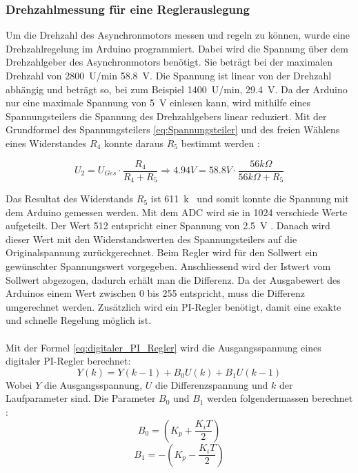\subsubsection{Drehzahlmessung für eine Reglerauslegung}
Um die Drehzahl des Asynchronmotors messen und regeln zu können, wurde eine Drehzahlregelung im Arduino programmiert. Dabei wird die Spannung über dem Drehzahlgeber des Asynchronmotors benötigt. Sie beträgt bei der maximalen Drehzahl von \SI{2800}{U/min} \SI{58.8}{V}. Die Spannung ist linear von der Drehzahl abhängig und beträgt so, bei zum Beispiel \SI{1400}{U/min}, \SI{29.4}{V}. Da der Arduino nur eine maximale Spannung von \SI{5}{V} einlesen kann, wird mithilfe eines Spannungsteilers die Spannung des Drehzahlgebers linear reduziert. Mit der Grundformel des Spannungsteilers \ref{eq:Spannungsteiler} und des freien Wählens eines Widerstandes $R_4$ konnte daraus $R_5$ bestimmt werden \cite{Spannungsteiler}:

\begin{equation}\label{eq:Spannungsteiler}
U_2=U_{Ges} \cdot\frac{R_4}{R_4 + R_5} \Longrightarrow 4.94 V = 58.8 V \cdot \frac{56k\Omega}{56k\Omega + R_5}
\end{equation}

Das Resultat des Widerstands $R_5$ ist \SI{611}{k\Omega} und somit konnte die Spannung mit dem Arduino gemessen werden. Mit dem ADC wird sie in 1024 verschiede Werte aufgeteilt. Der Wert 512 entspricht  einer Spannung von \SI{2.5}{V} \cite{Spannungsmessung}. Danach wird dieser Wert mit den Widerstandswerten des Spannungsteilers auf die Originalspannung zurückgerechnet. Beim Regler wird für den Sollwert ein gewünschter Spannungswert vorgegeben. Anschliessend wird der Istwert vom Sollwert abgezogen, dadurch erhält man die Differenz. Da der Ausgabewert des Arduinos einem Wert zwischen 0 bis 255 entspricht, muss die Differenz umgerechnet werden. Zusätzlich wird ein PI-Regler benötigt, damit eine exakte und schnelle Regelung möglich ist.\\\\
Mit der Formel \ref{eq:digitaler_PI_Regler} wird die Ausgangsspannung eines digitaler PI-Regler berechnet: \cite{Quelle_Marco} 
\begin{equation}\label{eq:digitaler_PI_Regler}
Y(k) = Y(k-1)+ B_0U(k)+B_1U(k-1)
\end{equation}
Wobei $Y$ die Ausgangsspannung, $U$ die Differenzspannung und $k$ der Laufparameter sind. Die Parameter $B_0$ und $B_1$ werden folgendermassen berechnet \cite{PI_Regler}:
\begin{equation}\label{eq:B0}
B_0 = \left(K_p + \frac{K_iT}{2}\right) 
\end{equation}
\begin{equation}\label{eq:B1}
B_1 = -\left(K_p - \frac{K_iT}{2}\right) 
\end{equation}

